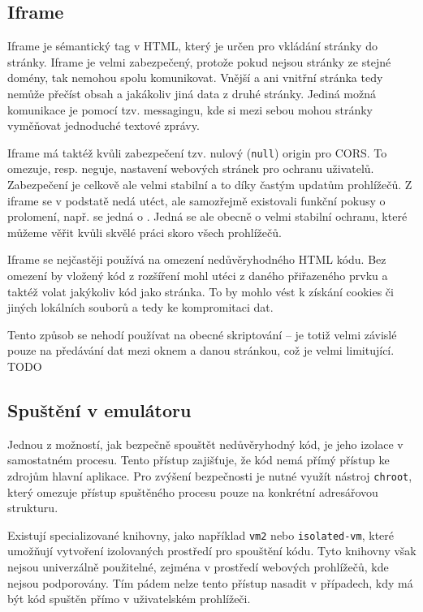 \subsection{Iframe}

Iframe je sémantický tag v HTML, který je určen pro vkládání stránky do stránky.
Iframe je velmi zabezpečený, protože pokud nejsou stránky ze stejné domény, tak nemohou spolu komunikovat.
Vnější a ani vnitřní stránka tedy nemůže přečíst obsah a jakákoliv jiná data z druhé stránky.
Jediná možná komunikace je pomocí tzv. messagingu, kde si mezi sebou mohou stránky vyměňovat jednoduché textové zprávy.

Iframe má taktéž kvůli zabezpečení tzv. nulový (\texttt{null}) origin pro CORS.
To omezuje, resp. neguje, nastavení webových stránek pro ochranu uživatelů.
Zabezpečení je celkově ale velmi stabilní a to díky častým updatům prohlížečů.
Z iframe se v podstatě nedá utéct, ale samozřejmě existovali funkční pokusy o prolomení, např. se jedná o \cite{https://issues.chromium.org/issues/40090810}.
Jedná se ale obecně o velmi stabilní ochranu, které můžeme věřit kvůli skvělé práci skoro všech prohlížečů.

Iframe se nejčastěji používá na omezení nedůvěryhodného HTML kódu.
Bez omezení by vložený kód z rozšíření mohl utéci z daného přiřazeného prvku a taktéž volat jakýkoliv kód jako stránka.
To by mohlo vést k získání cookies či jiných lokálních souborů a tedy ke kompromitaci dat.

Tento způsob se nehodí používat na obecné skriptování -- je totiž velmi závislé pouze na předávání dat mezi oknem a danou stránkou, což je velmi limitující.
TODO\todo

\subsection{Spuštění v emulátoru}

Jednou z možností, jak bezpečně spouštět nedůvěryhodný kód, je jeho izolace v samostatném procesu. 
Tento přístup zajišťuje, že kód nemá přímý přístup ke zdrojům hlavní aplikace. 
Pro zvýšení bezpečnosti je nutné využít nástroj \texttt{chroot}, který omezuje přístup spuštěného procesu pouze na konkrétní adresářovou strukturu.

Existují specializované knihovny, jako například \texttt{vm2} nebo \texttt{isolated-vm}, které umožňují vytvoření izolovaných prostředí pro spouštění kódu. 
Tyto knihovny však nejsou univerzálně použitelné, zejména v prostředí webových prohlížečů, kde nejsou podporovány. 
Tím pádem nelze tento přístup nasadit v případech, kdy má být kód spuštěn přímo v uživatelském prohlížeči.

